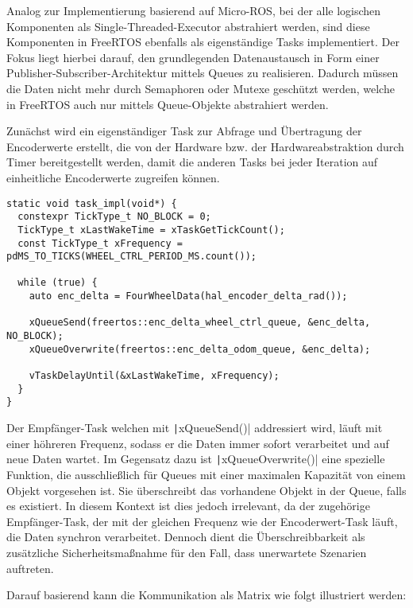 Analog zur Implementierung basierend auf Micro-ROS, bei der alle logischen
Komponenten als Single-Threaded-Executor abstrahiert werden, sind diese
Komponenten in FreeRTOS ebenfalls als eigenständige Tasks implementiert. Der
Fokus liegt hierbei darauf, den grundlegenden Datenaustausch in Form einer
Publisher-Subscriber-Architektur mittels Queues zu realisieren. Dadurch müssen
die Daten nicht mehr durch Semaphoren oder Mutexe geschützt werden, welche in
FreeRTOS auch nur mittels Queue-Objekte abstrahiert werden.

Zunächst wird ein eigenständiger Task zur Abfrage und Übertragung der
Encoderwerte erstellt, die von der Hardware bzw. der Hardwareabstraktion durch
Timer bereitgestellt werden, damit die anderen Tasks bei jeder Iteration auf
einheitliche Encoderwerte zugreifen können.

\begin{code}
\begin{verbatim}
static void task_impl(void*) {
  constexpr TickType_t NO_BLOCK = 0;
  TickType_t xLastWakeTime = xTaskGetTickCount();
  const TickType_t xFrequency = pdMS_TO_TICKS(WHEEL_CTRL_PERIOD_MS.count());

  while (true) {
    auto enc_delta = FourWheelData(hal_encoder_delta_rad());

    xQueueSend(freertos::enc_delta_wheel_ctrl_queue, &enc_delta, NO_BLOCK);
    xQueueOverwrite(freertos::enc_delta_odom_queue, &enc_delta);

    vTaskDelayUntil(&xLastWakeTime, xFrequency);
  }
}
\end{verbatim}
\end{code}


Der Empfänger-Task welchen mit \texttt|xQueueSend()| addressiert wird,
läuft mit einer höhreren Frequenz, sodass er die Daten immer sofort verarbeitet
und auf neue Daten wartet. Im Gegensatz dazu ist
\texttt|xQueueOverwrite()| eine spezielle Funktion, die ausschließlich
für Queues mit einer maximalen Kapazität von einem Objekt vorgesehen ist. Sie
überschreibt das vorhandene Objekt in der Queue, falls es existiert. In diesem
Kontext ist dies jedoch irrelevant, da der zugehörige Empfänger-Task, der mit
der gleichen Frequenz wie der Encoderwert-Task läuft, die Daten synchron
verarbeitet. Dennoch dient die Überschreibbarkeit als zusätzliche
Sicherheitsmaßnahme für den Fall, dass unerwartete Szenarien auftreten.

Darauf basierend kann die Kommunikation als Matrix wie folgt illustriert werden:

